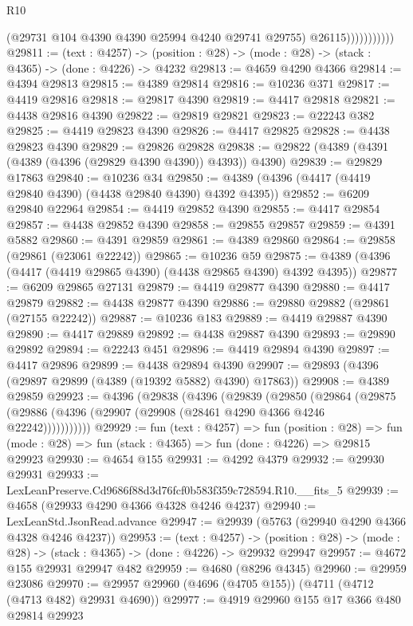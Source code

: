 \begin{lexlean}{R10}
\begin{coremodule}
                          (@29731 @104 @4390 @4390 @25994 @4240 @29741 @29755)
                          @26115)))))))))))
@29811 := (text : @4257) ->
  (position : @28) -> (mode : @28) -> (stack : @4365) -> (done : @4226) -> @4232
@29813 := @4659 @4290 @4366
@29814 := @4394 @29813
@29815 := @4389 @29814
@29816 := @10236 @371
@29817 := @4419 @29816
@29818 := @29817 @4390
@29819 := @4417 @29818
@29821 := @4438 @29816 @4390
@29822 := @29819 @29821
@29823 := @22243 @382
@29825 := @4419 @29823 @4390
@29826 := @4417 @29825
@29828 := @4438 @29823 @4390
@29829 := @29826 @29828
@29838 := @29822 (@4389 (@4391 (@4389 (@4396 (@29829 @4390 @4390)) @4393)) @4390)
@29839 := @29829 @17863
@29840 := @10236 @34
@29850 := @4389 (@4396 (@4417 (@4419 @29840 @4390) (@4438 @29840 @4390) @4392 @4395))
@29852 := @6209 @29840 @22964
@29854 := @4419 @29852 @4390
@29855 := @4417 @29854
@29857 := @4438 @29852 @4390
@29858 := @29855 @29857
@29859 := @4391 @5882
@29860 := @4391 @29859
@29861 := @4389 @29860
@29864 := @29858 (@29861 (@23061 @22242))
@29865 := @10236 @59
@29875 := @4389 (@4396 (@4417 (@4419 @29865 @4390) (@4438 @29865 @4390) @4392 @4395))
@29877 := @6209 @29865 @27131
@29879 := @4419 @29877 @4390
@29880 := @4417 @29879
@29882 := @4438 @29877 @4390
@29886 := @29880 @29882 (@29861 (@27155 @22242))
@29887 := @10236 @183
@29889 := @4419 @29887 @4390
@29890 := @4417 @29889
@29892 := @4438 @29887 @4390
@29893 := @29890 @29892
@29894 := @22243 @451
@29896 := @4419 @29894 @4390
@29897 := @4417 @29896
@29899 := @4438 @29894 @4390
@29907 := @29893 (@4396 (@29897 @29899 (@4389 (@19392 @5882) @4390) @17863))
@29908 := @4389 @29859
@29923 := @4396
    (@29838
      (@4396
        (@29839
          (@29850
            (@29864
              (@29875 (@29886 (@4396 (@29907 (@29908 (@28461 @4290 @4366 @4246 @22242)))))))))))
@29929 := fun (text : @4257) =>
  fun (position : @28) =>
  fun (mode : @28) => fun (stack : @4365) => fun (done : @4226) => @29815 @29923
@29930 := @4654 @155
@29931 := @4292 @4379
@29932 := @29930 @29931
@29933 := LexLeanPreserve.Cd9686f88d3d76fcf0b583f359c728594.R10.__fits_5
@29939 := @4658 (@29933 @4290 @4366 @4328 @4246 @4237)
@29940 := LexLeanStd.JsonRead.advance
@29947 := @29939 (@5763 (@29940 @4290 @4366 @4328 @4246 @4237))
@29953 := (text : @4257) ->
  (position : @28) -> (mode : @28) -> (stack : @4365) -> (done : @4226) -> @29932 @29947
@29957 := @4672 @155 @29931 @29947 @482
@29959 := @4680 (@8296 @4345)
@29960 := @29959 @23086
@29970 := @29957 @29960 (@4696 (@4705 @155)) (@4711 (@4712 (@4713 @482) @29931 @4690))
@29977 := @4919 @29960 @155 @17 @366 @480 @29814 @29923

\end{coremodule}
\end{lexlean}
